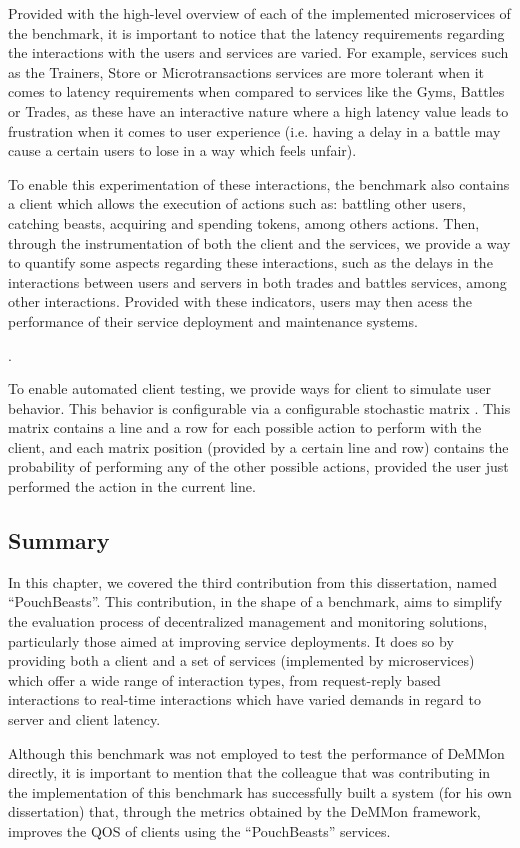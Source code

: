 Provided with the high-level overview of each of the implemented microservices of the benchmark, it is important to notice that the latency requirements regarding the interactions with the users and services are varied. For example, services such as the Trainers, Store or Microtransactions services are more tolerant when it comes to latency requirements when compared to services like the Gyms, Battles or Trades, as these have an interactive nature where a high latency value leads to frustration when it comes to user experience (i.e. having a delay in a battle may cause a certain users to lose in a way which feels unfair).

To enable this experimentation of these interactions, the benchmark also contains a client which allows the execution of actions such as: battling other users, catching beasts, acquiring and spending tokens, among others actions. Then, through the instrumentation of both the client and the services, we provide a way to quantify some aspects regarding these interactions, such as the delays in the interactions between users and servers in both trades and battles services, among other interactions. Provided with these indicators, users may then acess the performance of their service deployment and maintenance systems.

.

To enable automated client testing, we provide ways for client to simulate user behavior. This behavior is configurable via a configurable stochastic matrix . This matrix contains a line and a row for each possible action to perform with the client, and each matrix position (provided by a certain line and row) contains the probability of performing any of the other possible actions, provided the user just performed the action in the current line. 

\subsection{Summary}

In this chapter, we covered the third contribution from this dissertation, named ``PouchBeasts''. This contribution, in the shape of a benchmark, aims to simplify the evaluation process of decentralized management and monitoring solutions, particularly those aimed at improving service deployments. It does so by providing both a client and a set of services (implemented by microservices) which offer a wide range of interaction types, from request-reply based interactions to real-time interactions which have varied demands in regard to server and client latency.

Although this benchmark was not employed to test the performance of DeMMon directly, it is important to mention that the colleague that was contributing in the implementation of this benchmark has successfully built a system (for his own dissertation) that, through the metrics obtained by the DeMMon framework, improves the QOS of clients using the ``PouchBeasts'' services.